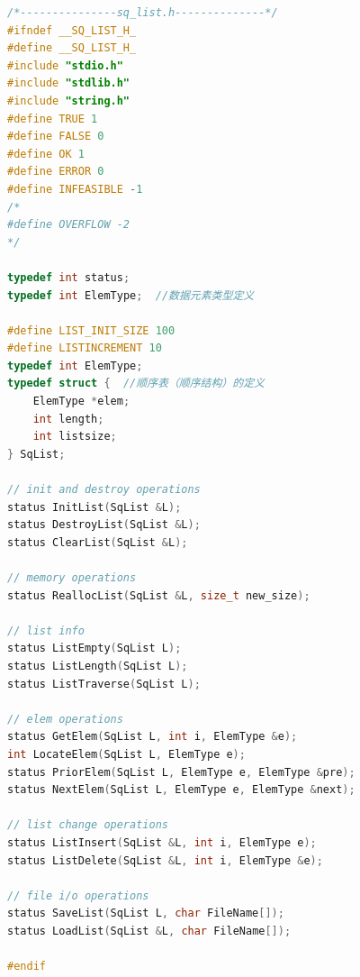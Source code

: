 \documentclass[supercite]{Experimental_Report}
\theoremstyle{definition}
\begin{document}
\begin{lstlisting}[caption={$sq\_list.h$}, language=C++, frame=single]
/*---------------sq_list.h--------------*/
#ifndef __SQ_LIST_H_
#define __SQ_LIST_H_
#include "stdio.h"
#include "stdlib.h"
#include "string.h"
#define TRUE 1
#define FALSE 0
#define OK 1
#define ERROR 0
#define INFEASIBLE -1
/*
#define OVERFLOW -2
*/

typedef int status;
typedef int ElemType;  //数据元素类型定义

#define LIST_INIT_SIZE 100
#define LISTINCREMENT 10
typedef int ElemType;
typedef struct {  //顺序表（顺序结构）的定义
    ElemType *elem;
    int length;
    int listsize;
} SqList;

// init and destroy operations
status InitList(SqList &L);
status DestroyList(SqList &L);
status ClearList(SqList &L);

// memory operations
status ReallocList(SqList &L, size_t new_size);

// list info
status ListEmpty(SqList L);
status ListLength(SqList L);
status ListTraverse(SqList L);

// elem operations
status GetElem(SqList L, int i, ElemType &e);
int LocateElem(SqList L, ElemType e);
status PriorElem(SqList L, ElemType e, ElemType &pre);
status NextElem(SqList L, ElemType e, ElemType &next);

// list change operations
status ListInsert(SqList &L, int i, ElemType e);
status ListDelete(SqList &L, int i, ElemType &e);

// file i/o operations
status SaveList(SqList L, char FileName[]);
status LoadList(SqList &L, char FileName[]);

#endif
\end{lstlisting}
\end{document}
